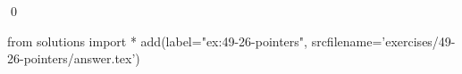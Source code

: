 
\begin{ex}
  \label{ex:49-26-pointers}
  
  \qed
\end{ex}
\begin{python0}
from solutions import *
add(label="ex:49-26-pointers",
    srcfilename='exercises/49-26-pointers/answer.tex')
\end{python0}
